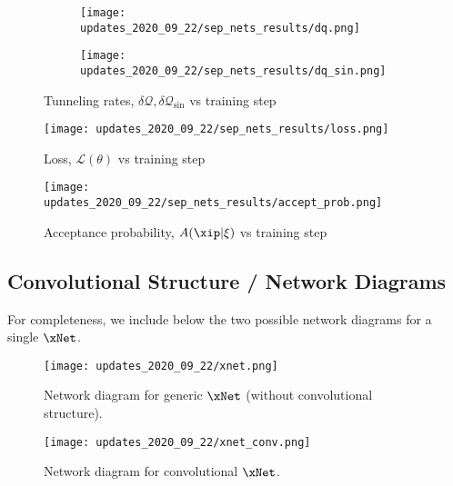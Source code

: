 %
\begin{figure}[htpb]
  \centering
  \begin{subfigure}[htpb]{\textwidth}
    \texttt{[image: updates\_2020\_09\_22/sep\_nets\_results/dq.png]}
  \end{subfigure}
  \begin{subfigure}[htpb]{\textwidth}
    \texttt{[image: updates\_2020\_09\_22/sep\_nets\_results/dq\_sin.png]}
  \end{subfigure}
  \caption{Tunneling rates, \(\delta \mathcal{Q}, \delta\mathcal{Q}_{\sin}\)
  vs training step}
\end{figure}
%
\begin{figure}[htpb]
  \centering
  \texttt{[image: updates\_2020\_09\_22/sep\_nets\_results/loss.png]}
  \caption{Loss, \(\mathcal{L}(\theta)\) vs training step} 
\end{figure}
%
\begin{figure}[htpb]
  \centering
  \texttt{[image: updates\_2020\_09\_22/sep\_nets\_results/accept\_prob.png]}
  \caption{Acceptance probability, \(A(\xip|\xi)\) vs training step} 
\end{figure}
%

\clearpage
\subsection{Convolutional Structure / Network Diagrams}
For completeness, we include below the two possible network diagrams for a
single \(\xNet\).

\begin{figure}[htpb]
  \centering
  \texttt{[image: updates\_2020\_09\_22/xnet.png]}
  \caption{Network diagram for generic \(\xNet\) (without convolutional
  structure).}
\end{figure}
%
\begin{figure}[htpb]
  \centering
  \texttt{[image: updates\_2020\_09\_22/xnet\_conv.png]}
  \caption{Network diagram for convolutional \(\xNet\).}
\end{figure}
